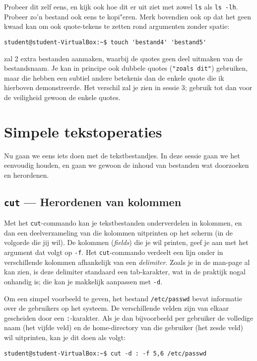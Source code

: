 \documentclass[a4paper,twoside,openany]{memoir}
\begin{document}
Probeer dit zelf eens, en kijk ook hoe dit er uit ziet met zowel \verb!ls! als \verb!ls -lh!. Probeer zo'n bestand ook eens te kopi"eren. Merk bovendien ook op dat het geen kwaad kan om ook quote-tekens te zetten rond argumenten zonder spatie:

\begin{verbatim}
student@student-VirtualBox:~$ touch 'bestand4' 'bestand5'
\end{verbatim}

zal 2 extra bestanden aanmaken, waarbij de quotes geen deel uitmaken van de bestandsnaam. Je kan in principe ook dubbele quotes (\verb!"zoals dit"!) gebruiken, maar die hebben een subtiel andere betekenis dan de enkele quote die ik hierboven demonstreerde. Het verschil zal je zien in sessie 3; gebruik tot dan voor de veiligheid gewoon de enkele quotes.

\chapter{Simpele tekstoperaties}

Nu gaan we eens iets doen met de tekstbestandjes. In deze sessie gaan we het eenvoudig houden, en gaan we gewoon de inhoud van bestanden wat doorzoeken en herordenen.

\section{\texttt{cut} --- Herordenen van kolommen}

Met het \verb!cut!-commando kan je tekstbestanden onderverdelen in kolommen, en dan een deelverzameling van die kolommen uitprinten op het scherm (in de volgorde die jij wil). De kolommen (\emph{fields}) die je wil printen, geef je aan met het argument dat volgt op \verb!-f!. Het \verb!cut!-commando verdeelt een lijn onder in verschillende kolommen afhankelijk van een \emph{delimiter}. Zoals je in de man-page al kan zien, is deze delimiter standaard een tab-karakter, wat in de praktijk nogal onhandig is; die kan je makkelijk aanpassen met \verb!-d!.

Om een simpel voorbeeld te geven, het bestand \verb!/etc/passwd! bevat informatie over de gebruikers op het systeem. De verschillende velden zijn van elkaar gescheiden door een \verb!:!-karakter. Als je dan bijvoorbeeld per gebruiker de volledige naam (het vijfde veld) en de home-directory van die gebruiker (het zesde veld) wil uitprinten, kan je dit doen als volgt:

\begin{verbatim}
student@student-VirtualBox:~$ cut -d : -f 5,6 /etc/passwd
\end{verbatim}
\end{document}
